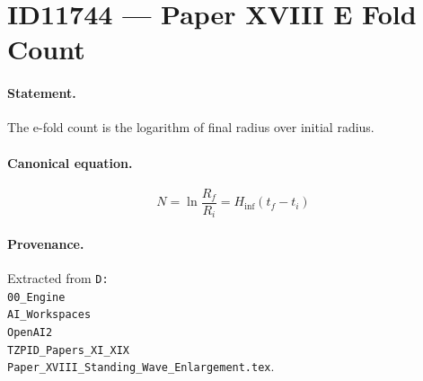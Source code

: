 \section*{ID11744 --- Paper XVIII E Fold Count}

\paragraph{Statement.}
The e-fold count is the logarithm of final radius over initial radius.

\paragraph{Canonical equation.}
\[
N=\ln\frac{R_f}{R_i}=H_{\mathrm{inf}}(t_f-t_i)
\]

\paragraph{Provenance.}
Extracted from \texttt{D:\\00\_Engine\\AI\_Workspaces\\OpenAI2\\TZPID\_Papers\_XI\_XIX\\Paper\_XVIII\_Standing\_Wave\_Enlargement.tex}.
